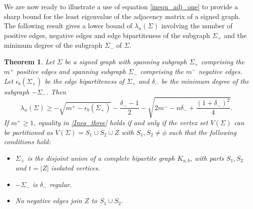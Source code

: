 \documentclass[12pt]{article}
\theoremstyle{plain}
\newtheorem{theorem}{Theorem}[section]
\numberwithin{equation}{section}
\begin{document}
	We are now ready to illustrate a use of equation \eqref{inequ_adj_one} to provide a sharp bound for the least eigenvalue of the adjacency matrix of a signed graph.\\
	The following result gives a lower bound of $\lambda_{n}(\Sigma)$ involving the number of positive edges, negative edges and edge bipartiteness of the subgraph $\Sigma_+$ and the minimum degree of the subgraph $\Sigma_-$ of  $\Sigma$.
	\begin{theorem}\label{adj_small_three}
		Let $\Sigma$ be a signed graph with spanning subgraph $\Sigma_{+}$ comprising the $m^{+}$ positive edges and spanning subgraph $\Sigma_{-}$ comprising the $m^{-}$ negative edges. Let $\epsilon_{b}(\Sigma_{+})$ be the edge bipartiteness of $\Sigma_{+}$ and $\delta_{-}$ be the minimum degree of the subgraph $-\Sigma_{-}.$ Then
		\begin{equation}\label{Ineq_three}
			\lambda_{n}(\Sigma)\geq  -\sqrt{m^{+}-\epsilon_{b}(\Sigma_{+})}-\frac{\delta_{-}-1}{2}-\sqrt{2m^{-}-n\delta_{-}+\frac{(1+\delta_{-})^{2}}{4}}.
		\end{equation}
		If $m^+ \geq 1$, equality in \eqref{Ineq_three} holds if and only if the vertex set $V(\Sigma)$ can be partitioned as $V(\Sigma)= S_1 \dot{\cup} S_2 \dot{\cup} Z $ with $S_1, S_2 \neq \phi$ such that the following conditions hold:
		\begin{itemize}
			\item [(C1)] $\Sigma_+$ is the disjoint union of a complete bipartite graph $K_{a,b}$, with parts $S_1, S_2$ and $t = \vert Z \vert$ isolated vertices.
			\item [(C2)] $-\Sigma_-$ is $\delta_-$ regular.
			\item [(C3)] No negative edges join $Z$ to $S_1 \cup S_2$.
		\end{itemize}
	\end{theorem}
\end{document}
